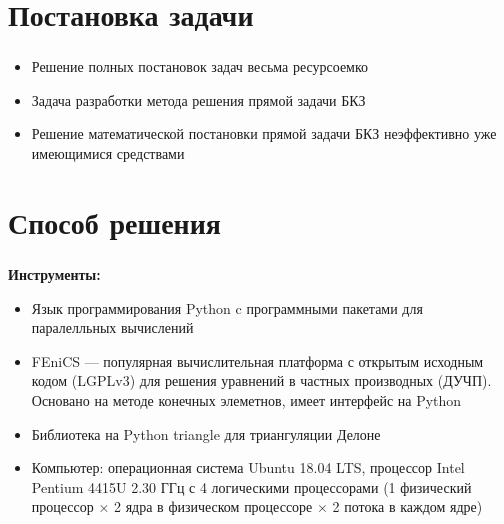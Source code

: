 

\frame[plain]{\titlepage} %


\section{Постановка задачи}

\begin{frame}
\frametitle{\insertsection}

\begin{itemize}    
    \item Решение полных постановок задач весьма ресурсоемко
    \item Задача разработки метода решения прямой задачи БКЗ
    \item Решение математической постановки прямой задачи БКЗ неэффективно уже имеющимися средствами
\end{itemize}
\end{frame}


\section{Способ решения}

\begin{frame}
\frametitle{\insertsection}

\textbf{Инструменты:}
\begin{itemize}
    \item Язык программирования Python c программными пакетами для паралелльных вычислений

    \item FEniCS — популярная вычислительная платформа с открытым исходным
    кодом (LGPLv3) для решения уравнений в частных производных (ДУЧП). Основано на методе конечных элеметнов, имеет интерфейс на Python

    \item Библиотека на Python triangle для триангуляции Делоне
    \item Компьютер: операционная система
    Ubuntu 18.04 LTS, процессор Intel Pentium 4415U 2.30 ГГц с 4 логическими
    процессорами (1 физический процессор $\times$ 2 ядра в физическом процессоре $\times$
    2 потока в каждом ядре)
\end{itemize}
\end{frame}

